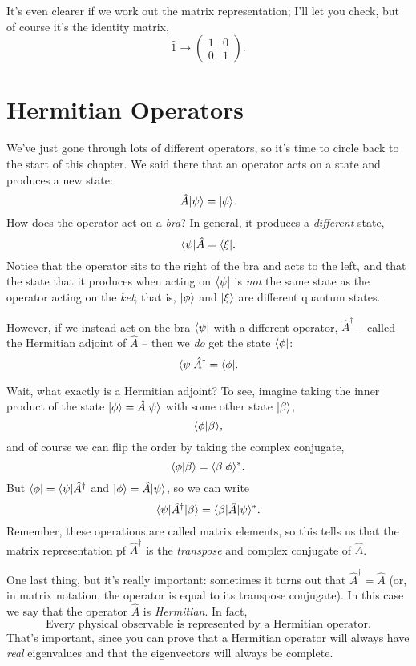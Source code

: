 It's even clearer if we work out the matrix representation; I'll let you check, but of course it's the identity matrix,
\begin{equation}
\hat{1} \to \begin{pmatrix} 1 & 0 \\ 0 & 1 \end{pmatrix}.
\end{equation}

\section{Hermitian Operators}

We've just gone through lots of different operators, so it's time to circle back to the start of this chapter.  We said there that an operator acts on a state and produces a new state:
\[
\hat{A} | \psi \rangle = | \phi \rangle.
\]
How does the operator act on a \emph{bra}?  In general, it produces a \emph{different} state,
\begin{equation}
\langle \psi | \hat{A} = \langle \xi |.
\end{equation}
Notice that the operator sits to the right of the bra and acts to the left, and that the state that it produces when acting on $\langle \psi |$ is \emph{not} the same state as the operator acting on the \emph{ket}; that is, $| \phi \rangle$ and $| \xi \rangle$ are different quantum states.

However, if we instead act on the bra $\langle \psi |$ with a different operator, $\hat{A}^\dagger$ -- called the Hermitian adjoint of $\hat{A}$ -- then we \emph{do} get the state $\langle \phi |$:
\begin{equation}
\langle \psi | \hat{A}^\dagger = \langle \phi |.
\end{equation}

Wait, what exactly is a Hermitian adjoint?  To see, imagine taking the inner product of the state $| \phi \rangle = \hat{A} | \psi \rangle$ with some other state $| \beta \rangle$,
\[
\langle \phi | \beta \rangle,
\]
and of course we can flip the order by taking the complex conjugate,
\[
\langle \phi | \beta \rangle = \langle \beta | \phi \rangle^*.
\]
But $\langle \phi | = \langle \psi |\hat{A}^\dagger$ and $| \phi \rangle = \hat{A} | \psi \rangle$, so we can write
\[
\langle \psi |\hat{A}^\dagger | \beta \rangle = \langle \beta | \hat{A} | \psi \rangle^*.
\]
Remember, these operations are called matrix elements, so this tells us that the matrix representation pf $\hat{A}^\dagger$ is the \emph{transpose} and complex conjugate of $\hat{A}$.

One last thing, but it's really important:  sometimes it turns out that $\hat{A}^\dagger = \hat{A}$ (or, in matrix notation, the operator is equal to its transpose conjugate).  In this case we say that the operator $\hat{A}$ is \emph{Hermitian}.  In fact,
\[
\boxed{\text{Every physical observable is represented by a Hermitian operator.}}
\]
That's important, since you can prove that a Hermitian operator will always have \emph{real} eigenvalues and that the eigenvectors will always be complete.

